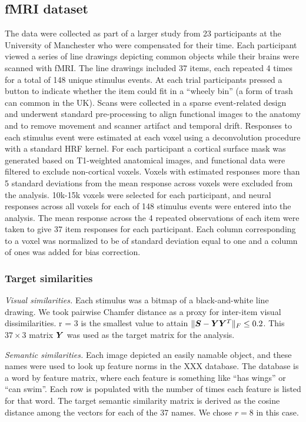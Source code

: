 \subsection{fMRI dataset} The data were collected as part of a larger study from 23
participants at the University of Manchester who were compensated for their time. Each
participant viewed a series of line drawings depicting common objects while their brains
were scanned with fMRI. The line drawings included 37 items, each repeated 4 times for a
total of 148 unique stimulus events. At each trial participants pressed a button to
indicate whether the item could fit in a ``wheely bin'' (a form of trash can common in the
UK).
Scans were collected in a sparse event-related design and underwent standard
pre-processing to align functional images to the anatomy and to remove movement and
scanner artifact and temporal drift. Responses to each stimulus event were estimated at
each voxel using a deconvolution procedure with a standard HRF kernel. For each
participant a cortical surface mask was generated based on T1-weighted anatomical images,
and functional data were filtered to exclude non-cortical voxels. Voxels with estimated
responses more than 5 standard deviations from the mean response across voxels were
excluded from the analysis. 10k-15k voxels were selected for each participant, and neural
responses across all voxels for each of 148 stimulus events were entered into the
analysis. The mean response across the 4 repeated observations of each item were taken to
give 37 item responses for each participant. Each column corresponding to a voxel was
normalized to be of standard deviation equal to one and a column of ones was added for
bias correction.

\subsubsection*{Target similarities}
 \textit{Visual similarities.} Each stimulus was a bitmap of a black-and-white line
 drawing. We took pairwise Chamfer distance as a proxy for inter-item visual
 dissimilarities. r = 3 is the smallest value to attain $\|\boldsymbol{S} - \boldsymbol{Y}\boldsymbol{Y}^T\|_F \leq 0.2$.
 This $37 \times 3$ matrix $\boldsymbol{Y}$ was used as the target matrix for the analysis.
 
\textit{Semantic similarities.} Each image depicted an easily namable object, and these
names were used to look up feature norms in the XXX database. The database is a word by
feature matrix, where each feature is something like ``has wings'' or ``can swim''. Each
row is populated with the number of times each feature is listed for that word. The target
semantic similarity matrix is derived as the cosine distance among the vectors for each of
the 37 names. We chose $r = 8$ in this case.

